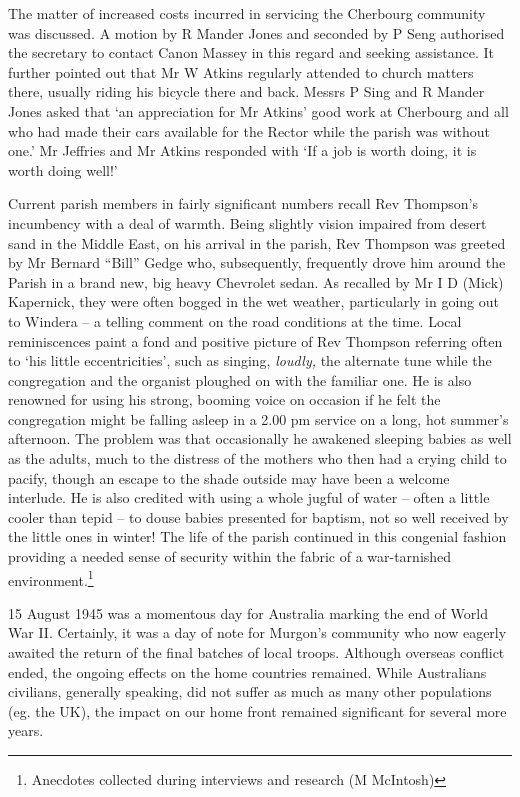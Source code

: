 The matter of increased costs incurred in servicing the Cherbourg community was discussed. A motion by R Mander Jones and seconded by P Seng authorised the secretary to contact Canon Massey in this regard and seeking assistance. It further pointed out that Mr W Atkins regularly attended to church matters there, usually riding his bicycle there and back. Messrs P Sing and R Mander Jones asked that `an appreciation for Mr Atkins' good work at Cherbourg and all who had made their cars available for the Rector while the parish was without one.' Mr Jeffries and Mr Atkins responded with `If a job is worth doing, it is worth doing well!'

Current parish members in fairly significant numbers recall Rev Thompson's incumbency with a deal of warmth. Being slightly vision impaired from desert sand in the Middle East, on his arrival in the parish, Rev Thompson was greeted by Mr Bernard ``Bill'' Gedge who, subsequently, frequently drove him around the Parish in a brand new, big heavy Chevrolet sedan. As recalled by Mr I D (Mick) Kapernick, they were often bogged in the wet weather, particularly in going out to Windera -- a telling comment on the road conditions at the time. Local reminiscences paint a fond and positive picture of Rev Thompson referring often to `his little eccentricities', such as singing, \emph{loudly,} the alternate tune while the congregation and the organist ploughed on with the familiar one. He is also renowned for using his strong, booming voice on occasion if he felt the congregation might be falling asleep in a 2.00 pm service on a long, hot summer's afternoon. The problem was that occasionally he awakened sleeping babies as well as the adults, much to the distress of the mothers who then had a crying child to pacify, though an escape to the shade outside may have been a welcome interlude. He is also credited with using a whole jugful of water -- often a little cooler than tepid -- to douse babies presented for baptism, not so well received by the little ones in winter! The life of the parish continued in this congenial fashion providing a needed sense of security within the fabric of a war-tarnished environment.\footnote{Anecdotes collected during interviews and research (M McIntosh)}

15 August 1945 was a momentous day for Australia marking the end of World War II. Certainly, it was a day of note for Murgon's community who now eagerly awaited the return of the final batches of local troops. Although overseas conflict ended, the ongoing effects on the home countries remained. While Australians civilians, generally speaking, did not suffer as much as many other populations (eg. the UK), the impact on our home front remained significant for several more years.

